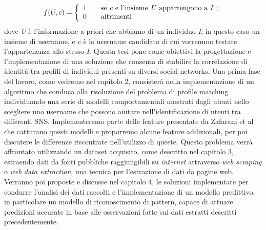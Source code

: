 \[ f(U,c) = \left\{
\begin{array}{l l}
	1 & \quad \text{se \textit{c} e l'insieme \textit{U} appartengono a \textit{I} ;}\\
	0 & \quad \text{altrimenti}
	\end{array} \right.\]  dove \textit{U} è l'informazione a priori che abbiamo di un individuo \textit{I}, in questo caso un insieme di username, e \textit{c} è lo username candidato di cui vorremmo testare l'appartenenza allo stesso \textit{I}.\newline
Questa tesi pone come obiettivi la progettazione e l'implementazione di una soluzione
che consenta di stabilire la correlazione di identità tra profili di individui presenti su diversi social networks. Una prima fase del lavoro, come vedremo nel capitolo 2, consisterà nella implementazione di un algoritmo che conduca alla risoluzione del problema di profile matching individuando una serie di modelli comportamentali mostrati dagli utenti nello scegliere uno username che possono aiutare nell'identificazione di utenti tra differenti SNS. Implementeremo parte delle feature presentate da Zafarani et al\cite{zafarani13} che catturano questi modelli e proporremo alcune feature addizionali, per poi discutere le differenze riscontrate nell'utilizzo di queste. Questo problema verrà affrontato utilizzando un dataset acquisito, come descritto nel capitolo 3, estraendo dati da fonti pubbliche raggiungibili su \textit{internet} attraverso \textit{web scraping} o \textit{web data extraction}, una tecnica per l'estrazione di dati da pagine web. Verranno poi proposte e discusse nel capitolo 4, le soluzioni implementate per condurre l'analisi dei dati raccolti e l'implementazione di un modello predittivo, in particolare un modello di riconoscimento di pattern, capace di attuare predizioni accurate in base alle osservazioni fatte sui dati estratti descritti precedentemente.
